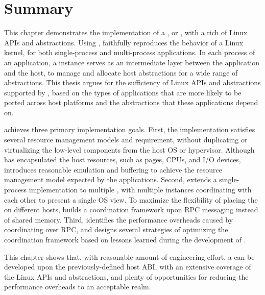 \section{Summary}

This chapter demonstrates the implementation of a \libos{}, or \thelibos{}, with a rich of Linux APIs and abstractions.
Using \thehostabi{},
\thelibos{} faithfully reproduces the behavior of a Linux kernel,
for both single-process and multi-process applications.
In each process of an application,
a \thelibos{} instance serves as an intermediate layer
between the application and the host,
to manage and allocate host abstractions for a wide range of \libos{} abstractions.
This thesis argues for the sufficiency of Linux APIs and abstractions
supported by \thelibos{},
based on the types of applications that are more likely to be ported across host platforms and the abstractions that these applications depend on.


\thelibos{} achieves three primary implementation goals.
First, the \thelibos{} implementation satisfies
several resource management models and requirement, without duplicating or virtualizing the low-level components from the host OS or hypervisor.
Although \thehostabi{} has encapsulated the host resources,
such as pages, CPUs, and I/O devices,
\thelibos{} introduces reasonable emulation and buffering to achieve the resource management model expected by the applications.
Second, \thelibos{} extends a single-process implementation
to multiple \picoprocs{},
with multiple \thelibos{} instances coordinating with each other to present a single OS view.
To maximize the flexibility of placing the \picoprocs{}
on different hosts,
\thelibos{} builds a coordination framework upon RPC messaging instead of shared memory.
Third, \thelibos{} identifies the performance overheads
caused by coordinating over RPC, 
and designs several strategies of optimizing the coordination framework
based on lessons learned during the development of \graphene{}.


This chapter shows that, with reasonable amount of engineering effort,
a \libos{} can be developed upon the previously-defined host ABI, with an extensive coverage of the Linux APIs and abstractions, and plenty of opportunities for reducing the performance overheads to an acceptable realm.
